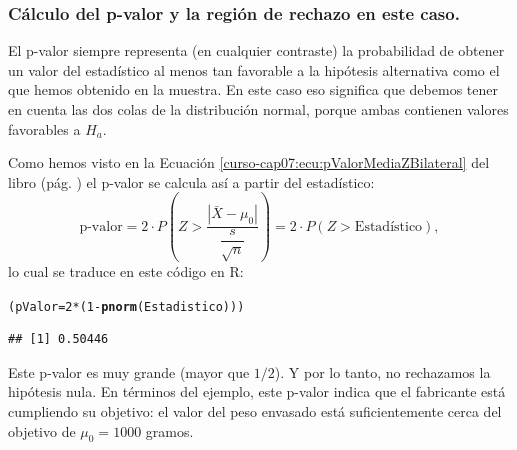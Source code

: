 \documentclass[10pt,a4paper]{article}\usepackage[]{graphicx}\usepackage[]{color}
\makeatletter
\newcommand{\hlnum}[1]{\textcolor[rgb]{0.686,0.059,0.569}{#1}}%
\newcommand{\hlopt}[1]{\textcolor[rgb]{0,0,0}{#1}}%
\newcommand{\hlstd}[1]{\textcolor[rgb]{0.345,0.345,0.345}{#1}}%
\newcommand{\hlkwb}[1]{\textcolor[rgb]{0.69,0.353,0.396}{#1}}%
\newcommand{\hlkwd}[1]{\textcolor[rgb]{0.737,0.353,0.396}{\textbf{#1}}}%
\newenvironment{kframe}{%
 \def\at@end@of@kframe{}%
 \ifinner\ifhmode%
  \def\at@end@of@kframe{\end{minipage}}%
  \begin{minipage}{\columnwidth}%
 \fi\fi%
 \def\FrameCommand##1{\hskip\@totalleftmargin \hskip-\fboxsep
 \colorbox{shadecolor}{##1}\hskip-\fboxsep
     \hskip-\linewidth \hskip-\@totalleftmargin \hskip\columnwidth}%
 \MakeFramed {\advance\hsize-\width
   \@totalleftmargin\z@ \linewidth\hsize
   \@setminipage}}%
 {\par\unskip\endMakeFramed%
 \at@end@of@kframe}
\newenvironment{knitrout}{}{} %
\newcounter {cont01}
\makeatother
\begin{document}
\subsubsection*{Cálculo del p-valor y la región de rechazo en este caso.}

El p-valor siempre representa (en cualquier contraste) la probabilidad de obtener un valor del estadístico al menos tan favorable a la hipótesis alternativa como el que hemos obtenido en la muestra. En este caso eso significa que debemos tener en cuenta las dos colas de la distribución normal, porque ambas contienen valores favorables a $H_a$.

Como hemos visto en la Ecuación \ref{curso-cap07:ecu:pValorMediaZBilateral} del libro (pág. \pageref{curso-cap07:ecu:pValorMediaZBilateral}) el p-valor se calcula así a partir del estadístico:
\[
\mbox{p-valor}=
2\cdot P\left(Z > \dfrac{|\bar X-\mu_0|}{\dfrac{s}{\sqrt{n}}}\right)=
2\cdot P\left(Z > \mbox{Estadístico}\right),
\]
lo cual se traduce en este código en R:
\begin{knitrout}
\color{fgcolor}\begin{kframe}
\begin{alltt}
\hlstd{(pValor} \hlkwb{=} \hlnum{2} \hlopt{*} \hlstd{(}\hlnum{1} \hlopt{-} \hlkwd{pnorm}\hlstd{(Estadistico)))}
\end{alltt}
\begin{verbatim}
## [1] 0.50446
\end{verbatim}
\end{kframe}
\end{knitrout}

Este p-valor es muy grande (mayor que $1/2$). Y por lo tanto, no rechazamos la hipótesis nula. En términos del ejemplo, este p-valor indica que el fabricante está cumpliendo su objetivo: el valor del peso envasado está suficientemente cerca del objetivo de $\mu_0=1000$ gramos.
\end{document}
